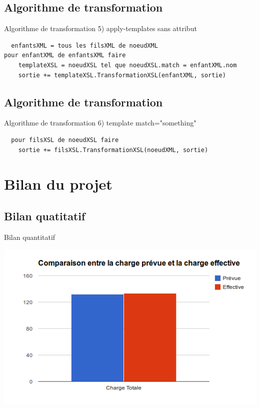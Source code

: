 \documentclass[aspectratio=169]{beamer}
\begin{document}
\subsection{Algorithme de transformation}
\begin{frame}[fragile]{Algorithme de transformation}
 5) apply-templates sans attribut
 \scriptsize
 \begin{verbatim}
  enfantsXML = tous les filsXML de noeudXML
pour enfantXML de enfantsXML faire
    templateXSL = noeudXSL tel que noeudXSL.match = enfantXML.nom
    sortie += templateXSL.TransformationXSL(enfantXML, sortie)
 \end{verbatim}
\normalsize
\end{frame}

\subsection{Algorithme de transformation}
\begin{frame}[fragile]{Algorithme de transformation}
 6) template match="something"
 \scriptsize
 \begin{verbatim}
  pour filsXSL de noeudXSL faire
    sortie += filsXSL.TransformationXSL(noeudXML, sortie)
 \end{verbatim}
\normalsize
\end{frame}

\section{Bilan du projet}
\subsection{Bilan quatitatif}
\begin{frame}{Bilan quantitatif}
\begin{center}
 \includegraphics[scale=0.5]{chargetot}
\end{center}
\end{frame}
\end{document}

